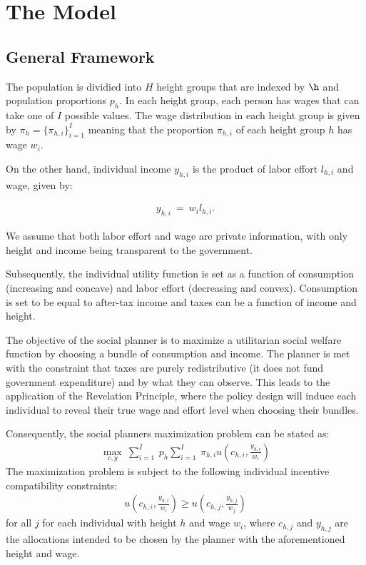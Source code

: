 \documentclass[titlepage]{\econtex}
\begin{document}
\hypertarget{The Model}{}
\section{The Model}

\hypertarget{General Framework}{}
\subsection{General Framework}

The population is dividied into $H$ height groups that are indexed by $\h$ and population proportions $p_h$. In each height group, each person has wages that can take one of $I$ possible values. The wage distribution in each height group is given by $\pi_h = \{ \pi_{h,i}\}_{i=1}^I$ meaning that the proportion $\pi_{h,i}$ of each height group $h$ has wage $w_i$.

On the other hand, individual income $y_{h,i}$ is the product of labor effort $l_{h,i}$ and wage, given by:

\begin{align}
    y_{h,i} \ = \ w_i l_{h,i}. 
\end{align}

  We assume that both labor effort and wage are private information, with only height and income being transparent to the government.

  Subsequently, the individual utility function is set as a function of consumption (increasing and concave) and labor effort (decreasing and convex). Consumption is set to be equal to after-tax income and taxes can be a function of income and height.

  The objective of the social planner is to  maximize a utilitarian social welfare function by choosing a bundle of consumption and income. The planner is met with the constraint that taxes are purely redistributive (it does not fund government expenditure) and by what they can observe. This leads to the application of the Revelation Principle, where the policy design will induce each individual to reveal their true wage and effort level when choosing their bundles.

  Consequently, the social planners maximization problem can be stated as:
 \begin{align}
   \max_{c,y}~ \sum_{i=1}^I \ p_{h} \sum_{i=1}^I \ \pi_{h,i} u\left(c_{h,i}, \frac{y_{h,i}}{w_i}\right)
 \end{align}
 The maximization problem is subject to the following individual incentive compatibility constraints:
 \begin{align}
   u\left(c_{h,i}, \frac{y_{h,i}}{w_i}\right) \geq u\left(c_{h,j}, \frac{y_{h,j}}{w_j}\right)
 \end{align}
 for all $j$ for each individual with height $h$ and wage $w_i$, where $c_{h,j}$ and $y_{h,j}$ are the allocations intended to be chosen by the planner with the aforementioned height and wage.
\end{document}
